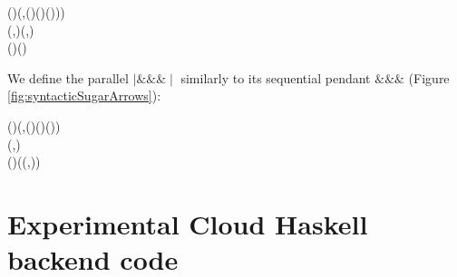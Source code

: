 \documentclass[paper=A4,twoside=true,openright,parskip=full,chapterprefix=true,headings=normal,bibliography=totoc,listof=totoc,titlepage=on,captions=tableabove,draft=false,british]{scrreprt}%
\begin{document}
\begin{hscode}\SaveRestoreHook
{}%
%
%
\>[B]{}(\mathbin{\mid\!\!*\!*\!*\!\!\mid})\mathbin{::}(\;,\;\;(\;\;)\;(\;\;)\;()))\Rightarrow {}\<[E]%
\\
\>[B]{}\<[5]%
\>[5]{}\;\;\to {}\;\;\to {}\;(,)\;(,){}\<[E]%
\\
\>[B]{}(\mathbin{\mid\!\!*\!*\!*\!\!\mid})\mathrel{=}\;(){}\<[E]%
\ColumnHook
\end{hscode}\resethooks
\vspace{-2\baselineskip}

We define the parallel \ensuremath{\mathbin{\mid\!\!\&\!\&\!\&\!\!\mid}} similarly to its sequential
pendant \ensuremath{\mathbin{\&\!\&\!\&}} (Figure \ref{fig:syntacticSugarArrows}):


\begin{hscode}\SaveRestoreHook
{}%
%
%
\>[B]{}(\mathbin{\mid\!\!\&\!\&\!\&\!\!\mid})\mathbin{::}(\;,\;\;(\;\;)\;(\;\;)\;())\Rightarrow {}\<[E]%
\\
\>[B]{}\<[5]%
\>[5]{}\;\;\to {}\;\;\to {}\;\;(,){}\<[E]%
\\
\>[B]{}(\mathbin{\mid\!\!\&\!\&\!\&\!\!\mid})\;\;\mathrel{=}(\mathbin{\$}\lambda {}\to (,))\mathbin{>\!\!>\!\!>}\mathbin{\mid\!\!*\!*\!*\!\!\mid}\<[E]%
\ColumnHook
\end{hscode}\resethooks
\vspace{-2\baselineskip}

\newpage

\hypertarget{experimental-cloud-haskell-backend-code}{%
\section{Experimental Cloud Haskell backend
code}\label{experimental-cloud-haskell-backend-code}}
\end{document}
